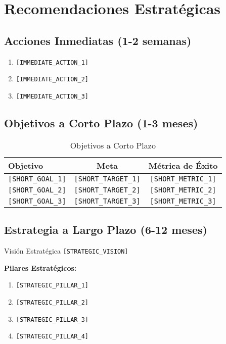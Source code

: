 \documentclass[12pt,a4paper]{article}
\begin{document}
\section{\textcolor{primaryblue}{Recomendaciones Estratégicas}}

\subsection{Acciones Inmediatas (1-2 semanas)}

\begin{enumerate}
    \item \texttt{[IMMEDIATE\_ACTION\_1]}
    \item \texttt{[IMMEDIATE\_ACTION\_2]}
    \item \texttt{[IMMEDIATE\_ACTION\_3]}
\end{enumerate}

\subsection{Objetivos a Corto Plazo (1-3 meses)}

\begin{table}[H]
\centering
\begin{tabular}{@{}lcc@{}}
\toprule
\textbf{Objetivo} & \textbf{Meta} & \textbf{Métrica de Éxito} \\
\midrule
\texttt{[SHORT\_GOAL\_1]} & \texttt{[SHORT\_TARGET\_1]} & \texttt{[SHORT\_METRIC\_1]} \\
\texttt{[SHORT\_GOAL\_2]} & \texttt{[SHORT\_TARGET\_2]} & \texttt{[SHORT\_METRIC\_2]} \\
\texttt{[SHORT\_GOAL\_3]} & \texttt{[SHORT\_TARGET\_3]} & \texttt{[SHORT\_METRIC\_3]} \\
\bottomrule
\end{tabular}
\caption{Objetivos a Corto Plazo}
\label{tab:short-goals}
\end{table}

\subsection{Estrategia a Largo Plazo (6-12 meses)}

\begin{infobox}{Visión Estratégica}
\texttt{[STRATEGIC\_VISION]}

\textbf{Pilares Estratégicos:}
\begin{enumerate}
    \item \texttt{[STRATEGIC\_PILLAR\_1]}
    \item \texttt{[STRATEGIC\_PILLAR\_2]}
    \item \texttt{[STRATEGIC\_PILLAR\_3]}
    \item \texttt{[STRATEGIC\_PILLAR\_4]}
\end{enumerate}
\end{infobox}
\end{document}
